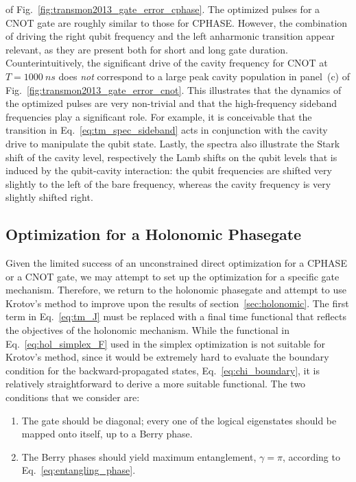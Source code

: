 of Fig.~\ref{fig:transmon2013_gate_error_cphase}.
The optimized pulses for a CNOT gate are roughly similar to those for CPHASE.
However, the combination of driving the right qubit frequency and the left
anharmonic transition appear relevant, as they are present both for short and
long gate duration. Counterintuitively, the significant drive of the cavity
frequency for CNOT at $T=\SI{1000}{ns}$ does \emph{not} correspond to a large
peak cavity population in panel~(c) of
Fig.~\ref{fig:transmon2013_gate_error_cnot}. This illustrates that the dynamics
of the optimized pulses are very non-trivial and that the high-frequency
sideband frequencies play a significant role. For example, it is conceivable
that the transition in Eq.~\eqref{eq:tm_spec_sideband} acts in conjunction with
the cavity drive to manipulate the qubit state.
Lastly, the spectra also illustrate the Stark shift of the cavity level,
respectively the Lamb shifts on the qubit levels that is induced by the
qubit-cavity interaction: the qubit frequencies are shifted very slightly to the
left of the bare frequency, whereas the cavity frequency is very slightly
shifted right.



\subsection{Optimization for a Holonomic Phasegate}

Given the limited success of an unconstrained direct optimization for a CPHASE
or a CNOT gate, we may attempt to set up the optimization for a specific gate
mechanism. Therefore, we return to the holonomic phasegate
and attempt to use Krotov's method to improve upon the results of
section~\ref{sec:holonomic}.
The first term in Eq.~\eqref{eq:tm_J} must be replaced with a final
time functional that reflects the objectives of the holonomic mechanism. While
the functional in Eq.~\eqref{eq:hol_simplex_F} used in the simplex
optimization is not suitable for Krotov's method, since it would be extremely
hard to evaluate the boundary condition for the backward-propagated states,
Eq.~\eqref{eq:chi_boundary}, it is relatively straightforward to derive a more
suitable functional. The two conditions that we consider are:
\begin{enumerate}
  \item The gate should be diagonal; every one of the logical eigenstates should
  be mapped onto itself, up to a Berry phase.
  \item The Berry phases should yield maximum entanglement, $\gamma = \pi$,
  according to Eq.~\eqref{eq:entangling_phase}.
\end{enumerate}

